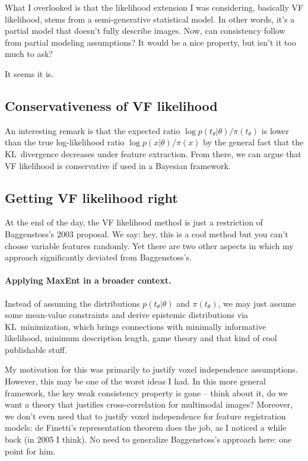 \documentclass[english]{scrartcl}
\begin{document}
What I overlooked is that the likelihood extension I was considering, basically VF likelihood, stems from a semi-generative statistical model. In other words, it's a partial model that doesn't fully describe images. Now, can consistency follow from partial modeling assumptions? It would be a nice property, but isn't it too much to ask?

It seems it is.

\subsection{Conservativeness of VF likelihood}

An interesting remark is that the expected ratio $\log p(t_\theta|\theta)/\pi(t_\theta)$ is lower than the true log-likelihood ratio $\log p(x|\theta)/\pi(x)$ by the general fact that the KL~divergence decreases under feature extraction. From there, we can argue that VF likelihood is conservative if used in a Bayesian framework.


\subsection{Getting VF likelihood right}

At the end of the day, the VF likelihood method is just a restriction of Baggenstoss's 2003 proposal. We say: hey, this is a cool method but you can't choose variable features randomly. Yet there are two other aspects in which my approach significantly deviated from Baggenstoss's.

\paragraph{Applying MaxEnt in a broader context.} Instead of assuming the distributions $p(t_\theta|\theta)$ and $\pi(t_\theta)$, we may just assume some mean-value constraints and derive epistemic distributions via KL~minimization, which brings connections with minimally informative likelihood, minimum description length, game theory and that kind of cool publishable stuff.

My motivation for this was primarily to justify voxel independence assumptions. However, this may be one of the worst ideas I had. In this more general framework, the key weak consistency property is gone -- think about it, do we want a theory that justifies cross-correlation for multimodal images? Moreover, we don't even need that to justify voxel independence for feature registration models: de Finetti's representation theorem does the job, as I noticed a while back (in 2005 I think). No need to generalize Baggenstoss's approach here: one point for him.
\end{document}
